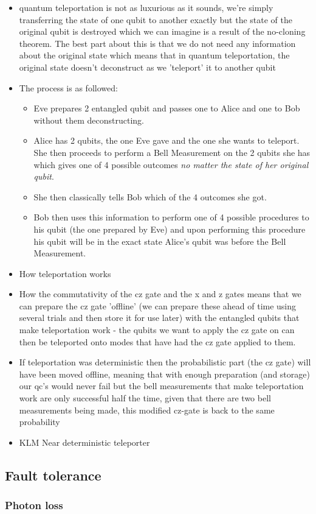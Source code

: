 \begin{itemize}
    \item quantum teleportation is not as luxurious as it sounds, we're simply transferring the state of one qubit to another exactly but the state of the original qubit is destroyed which we can imagine is a result of the no-cloning theorem. The best part about this is that we do not need any information about the original state which means that in quantum teleportation, the original state doesn't deconstruct as we 'teleport' it to another qubit
    \item The process is as followed:
    \begin{itemize}
        \item Eve prepares 2 entangled qubit and passes one to Alice and one to Bob without them deconstructing. 
        \item Alice has 2 qubits, the one Eve gave and the one she wants to teleport. She then proceeds to perform a Bell Measurement on the 2 qubits she has which gives one of 4 possible outcomes \textit{no matter the state of her original qubit}. 
        \item She then classically tells Bob which of the 4 outcomes she got.
        \item Bob then uses this information to perform one of 4 possible procedures to his qubit (the one prepared by Eve) and upon performing this procedure his qubit will be in the exact state Alice's qubit was before the Bell Measurement.
    \end{itemize}
    
\end{itemize}

\begin{itemize}
    \item How teleportation works
    \item How the commutativity of the cz gate and the x and z gates means that we can prepare the cz gate 'offline' (we can prepare these ahead of time using several trials and then store it for use later) with the entangled qubits that make teleportation work - the qubits we want to apply the cz gate on can then be teleported onto modes that have had the cz gate applied to them.
    \item If teleportation was deterministic then the probabilistic part (the cz gate) will have been moved offline, meaning that with enough preparation (and storage) our qc's would never fail but the bell measurements that make teleportation work are only successful half the time, given that there are two bell measurements being made, this modified cz-gate is back to the same probability
    \item KLM Near deterministic teleporter
\end{itemize}
\subsection{Fault tolerance}
\subsubsection{Photon loss}